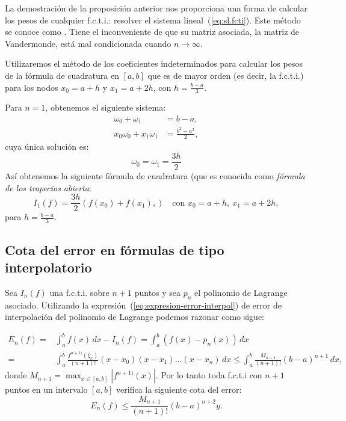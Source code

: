 \begin{remark}
  \label{rk:6}
  La demostración de la proposición anterior nos proporciona una forma
  de calcular los pesos de cualquier f.c.t.i.: resolver el sistema
lineal~(\ref{eq:sl.fcti}). Este método se conoce como . Tiene el inconveniente de que su
matriz asociada, la matriz de Vandermonde, está mal condicionada
  cuando $n\to\infty$.
\end{remark}

\begin{example}
  \label{ex:coef-indetermin:formula-trapecios-abierta}
  Utilizaremos el método de los coeficientes indeterminados para
  calcular los pesos de la fórmula de cuadratura en $[a,b]$ que es de
  mayor orden (es decir, la f.c.t.i.) para los nodos $x_0=a+h$ y
  $x_1=a+2h$, con $h=\frac{b-a}{3}$.
  
  Para $n=1$, obtenemos el siguiente sistema:
  \begin{align*}
    \omega_0 + \omega_1 &= b-a,
    \\ 
    x_0\omega_0 + x_1\omega_1 &= \frac{b^2-a^2}{2},
  \end{align*}
  cuya única solución es:
  \begin{equation*}
    \omega_0=\omega_1=\frac{3h}{2}
  \end{equation*}
  Así obtenemos la siguiente fórmula de cuadratura (que es conocida
  como \textit{fórmula de los trapecios abierta}:
  \begin{equation*}
    I_1(f)=\frac{3h}{2}
    \left(
      f(x_0)+f(x_1),
    \right)
    \quad \text{con } x_0=a+h, \ x_1=a+2h,
  \end{equation*}
  para $h=\frac{b-a}{3}$.
\end{example}

\subsection*{Cota del error en fórmulas de tipo interpolatorio}

Sea $I_n(f)$ una f.c.t.i. sobre $n+1$ puntos y sea $p_n$ el polinomio
de Lagrange asociado.  Utilizando la
expresión~(\ref{eq:expresion-error-interpol}) de error de
interpolación del polinomio de Lagrange podemos razonar como sigue:

\begin{align*}
  E_n(f)=&\int_a^b f(x)\, dx - I_n(f) =
  \int_a^b\left(f(x)-p_n(x)\right)\,dx 
  \\
  =&\int_a^b \frac{f^{n+1)}(\xi_x)}{(n+1)!} (x-x_0)(x-x_1)\dots(x-x_n) \,dx
  \le \int_a^b  \frac{M_{n+1}}{(n+1)!} (b-a)^{n+1} \, dx,
\end{align*}
donde $M_{n+1}=\max_{x\in [a,b]} |f^{n+1)}(x)|$.
Por lo tanto toda f.c.t.i con $n+1$ puntos en un intervalo $[a,b]$
verifica la siguiente cota del error:
\begin{equation}
  E_n(f) \le  \frac{M_{n+1}}{(n+1)!} (b-a)^{n+2}y.
  \label{eq:cota-error-fcti}
\end{equation}

